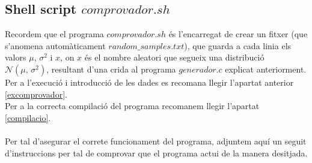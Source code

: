 \documentclass[a4paper, 11pt]{article}
\begin{document}
\subsection{Shell script $comprovador.sh$}
Recordem que el programa $comprovador.sh$ és l'encarregat de crear un fitxer (que s'anomena automàticament $random\_samples.txt$), que guarda a cada linia els valors $\mu$, $\sigma^2$ i $x$, on $x$ és el nombre aleatori que segueix una distribució $\mathcal{N}(\mu,\,\sigma^{2})$, resultant d'una crida al programa $generador.c$ explicat anteriorment.\\
Per a l’execució i introducció de les dades es recomana llegir l’apartat anterior \textcolor{blue}{\ref{excomprovador}}.\\
Per a la correcta compilació del programa recomanem llegir l'apartat \textcolor{blue}{\ref{compilacio}}.\\\\
Per tal d’asegurar el correte funcionament del programa, adjuntem aquí un seguit d’instruccions per tal de comprovar que el programa actui de la manera desitjada.
\end{document}
